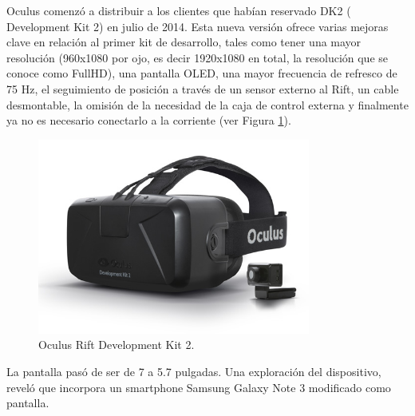 \documentclass[12pt]{article}
\begin{document}
Oculus comenzó a distribuir a los clientes que habían reservado DK2 ( Development Kit 2) en julio de 2014. Esta nueva versión ofrece varias mejoras clave en relación al primer kit de desarrollo, tales como tener una mayor resolución (960x1080 por ojo, es decir 1920x1080 en total, la resolución que se conoce como FullHD), una pantalla OLED, una mayor frecuencia de refresco de 75 Hz, el seguimiento de posición a través de un sensor externo al Rift, un cable desmontable,  la omisión de la necesidad de la caja de control externa y finalmente ya no es necesario conectarlo a la corriente (ver Figura \ref{dk2}).
\begin{figure}[h!]
\includegraphics[width=0.8\textwidth,center]{dk2.jpg}
\caption{Oculus Rift Development Kit 2.}
\label{dk2}
\end{figure}

La pantalla pasó de ser de 7 a 5.7 pulgadas. Una exploración del dispositivo, reveló que incorpora un smartphone Samsung Galaxy Note 3 modificado como pantalla.
\end{document}
